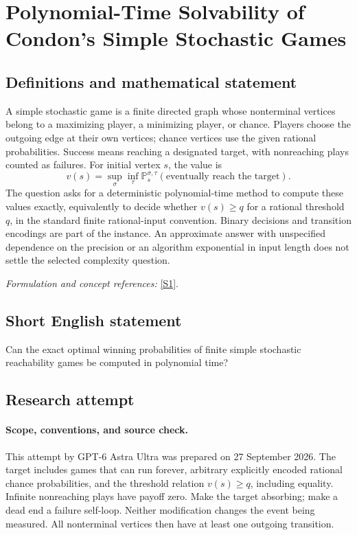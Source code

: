 \documentclass[11pt]{article}
\begin{document}
\section*{\texorpdfstring{Polynomial-Time Solvability of Condon's Simple Stochastic Games}{Polynomial-Time Solvability of Condon's Simple Stochastic Games}}\label{statement}
\subsection{Definitions and mathematical statement}
A simple stochastic game is a finite directed graph whose nonterminal vertices belong to a maximizing player, a minimizing player, or chance. Players choose the outgoing edge at their own vertices; chance vertices use the given rational probabilities. Success means reaching a designated target, with nonreaching plays counted as failures. For initial vertex $s$, the value is
\[
 v(s)=\sup_\sigma\inf_\tau
 {\mathbb{P}}_s^{\sigma,\tau}(\text{eventually reach the target}).
\]
The question asks for a deterministic polynomial-time method to compute these values exactly, equivalently to decide whether $v(s)\ge q$ for a rational threshold $q$, in the standard finite rational-input convention. Binary decisions and transition encodings are part of the instance. An approximate answer with unspecified dependence on the precision or an algorithm exponential in input length does not settle the selected complexity question.
\par\smallskip\textit{Formulation and concept references:} \href{https://dblp.org/rec/journals/iandc/Condon92.html}{[S1]}.

\subsection{Short English statement}
Can the exact optimal winning probabilities of finite simple stochastic reachability games be computed in polynomial time?
\subsection{Research attempt}
\paragraph{Scope, conventions, and source check.}
This attempt by GPT-6 Astra Ultra was prepared on 27 September 2026.
The target includes games that can run forever, arbitrary explicitly
encoded rational chance probabilities, and the threshold relation
$v(s)\geq q$, including equality. Infinite nonreaching plays have payoff
zero. Make the target absorbing; make a dead end a failure self-loop.
Neither modification changes the event being measured. All nonterminal
vertices then have at least one outgoing transition.
\end{document}
